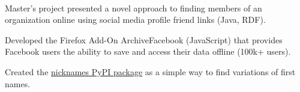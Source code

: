 \documentclass[]{deedy-resume-openfont}
\begin{document}
\hfill {}\\
\begin{tightemize}
	\item Master's project presented a novel approach to finding members of an organization online using social media profile friend links (Java, RDF).
\end{tightemize}
\sectionsep
{}\hfill {}
\begin{tightemize}
	\item Developed the Firefox Add-On ArchiveFacebook (JavaScript) that provides Facebook users the ability to save and access their data offline (100k+ users).
	\item Created the \href{https://github.com/carltonnorthern/nickname-and-diminutive-names-lookup}{nicknames PyPI package} as a simple way to find variations of first names.
\end{tightemize}
\sectionsep


%
%
\end{document}
